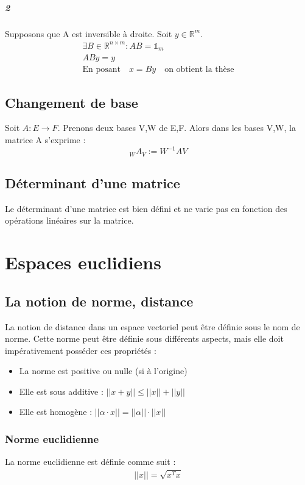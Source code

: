 \documentclass[a4paper]{book}
\begin{document}
\paragraph{2}
Supposons que A est inversible à droite. Soit $y \in \mathbb{R}^m$.
\begin{gather}
    \exists B \in \mathbb{R}^{n\times m} : AB = \mathbb{1}_m \\
    ABy = y \\
    \text{En posant} \quad x = By \quad \text{on obtient la thèse}
\end{gather}
\section{Changement de base}
Soit $A: E \rightarrow F$. Prenons deux bases V,W de E,F. Alors dans les bases V,W, la matrice A s'exprime :
\begin{equation}
    _WA_V := W^{-1}AV
\end{equation}
\section{Déterminant d'une matrice}
Le déterminant d'une matrice est bien défini et ne varie pas en fonction des opérations linéaires sur la matrice.
\chapter{Espaces euclidiens}
\section{La notion de norme, distance}
La notion de distance dans un espace vectoriel peut être définie sous le nom de norme. Cette norme peut être définie sous différents aspects, mais elle doit impérativement posséder ces propriétés :
\begin{itemize}
    \item La norme est positive ou nulle (si à l'origine)
    \item Elle est sous additive : $||x+y||\leq ||x|| + ||y||$
    \item Elle est homogène : $||\alpha\cdot x|| = ||\alpha||\cdot ||x||$
\end{itemize}
\subsection{Norme euclidienne}
La norme euclidienne est définie comme suit :
\begin{gather}
    ||x|| = \sqrt{x^Tx}
\end{gather}
\end{document}
